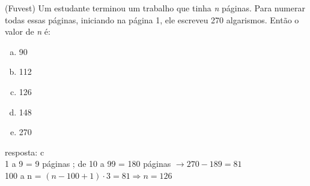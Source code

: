 \begin{ex}
 (Fuvest) Um estudante terminou um trabalho que tinha \textit{n} páginas. Para numerar todas essas páginas, iniciando na página 1, ele escreveu 270 algarismos. Então o valor de \textit{n} é:  
    \begin{enumerate}[(a)]
    \item 90
    \item 112
    \item 126
    \item 148
    \item 270
    \end{enumerate}
      \begin{sol}
      resposta: c \\
      1 a 9 = 9 páginas ; de 10 a 99 = 180 páginas $\rightarrow 270-189=81$ \\
      100 a n = $(n-100+1)\cdot3 = 81 \Longrightarrow n=126$
      \end{sol}
\end{ex}